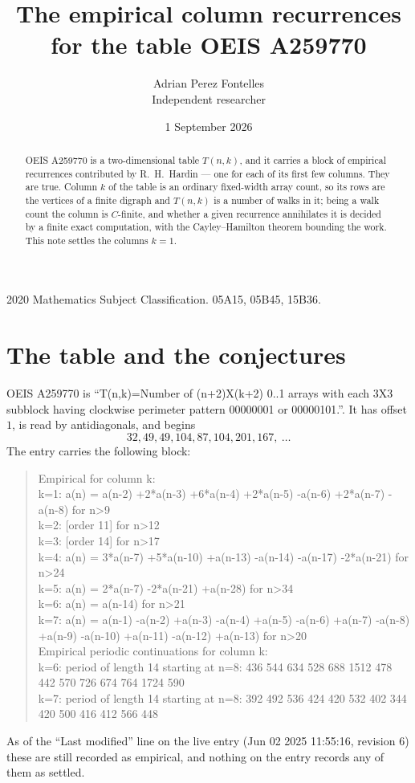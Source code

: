 \documentclass[11pt,a4paper]{article}
\title{The empirical column recurrences for the table OEIS A259770}
\author{Adrian Perez Fontelles\\ \small Independent researcher}
\date{1 September 2026}
\theoremstyle{plain}
\theoremstyle{definition}
\begin{document}
\maketitle

\begin{abstract}
OEIS A259770 is a two-dimensional table $T(n,k)$, and it carries a block of empirical
recurrences contributed by R.~H.~Hardin --- one for each of its first few columns. They are
true. Column $k$ of the table is an ordinary fixed-width array count, so its rows are the
vertices of a finite digraph and $T(n,k)$ is a number of walks in it; being a walk count the
column is $C$-finite, and whether a given recurrence annihilates it is decided by a finite
exact computation, with the Cayley--Hamilton theorem bounding the work. This note settles the columns $k=1$.
\end{abstract}

\noindent\small 2020 Mathematics Subject Classification. 05A15, 05B45, 15B36.\normalsize

\section{The table and the conjectures}

OEIS A259770 is ``T(n,k)=Number of (n+2)X(k+2) 0..1 arrays with each 3X3 subblock having clockwise perimeter pattern 00000001 or 00000101.''. It has offset $1$, is
read by antidiagonals, and begins
\[
32, 49, 49, 104, 87, 104, 201, 167,\ \dots
\]
The entry carries the following block:
\begin{quote}\small
Empirical for column k:\\
k=1: a(n) = a(n-2) +2*a(n-3) +6*a(n-4) +2*a(n-5) -a(n-6) +2*a(n-7) -a(n-8) for n>9\\
k=2: [order 11] for n>12\\
k=3: [order 14] for n>17\\
k=4: a(n) = 3*a(n-7) +5*a(n-10) +a(n-13) -a(n-14) -a(n-17) -2*a(n-21) for n>24\\
k=5: a(n) = 2*a(n-7) -2*a(n-21) +a(n-28) for n>34\\
k=6: a(n) = a(n-14) for n>21\\
k=7: a(n) = a(n-1) -a(n-2) +a(n-3) -a(n-4) +a(n-5) -a(n-6) +a(n-7) -a(n-8) +a(n-9) -a(n-10) +a(n-11) -a(n-12) +a(n-13) for n>20\\
Empirical periodic continuations for column k:\\
k=6: period of length 14 starting at n=8: 436 544 634 528 688 1512 478 442 570 726 674 764 1724 590\\
k=7: period of length 14 starting at n=8: 392 492 536 424 420 532 402 344 420 500 416 412 566 448\\
\end{quote}
As of the ``Last modified'' line on the live entry (Jun 02 2025 11:55:16, revision 6) these are still
recorded as empirical, and nothing on the entry records any of them as settled.
\end{document}

